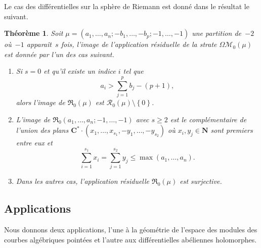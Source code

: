 \documentclass[JEP,XML,SOM,Unicode,francais,NoFloatCountersInSection,published]{cedram}
\let\mathcal\mathscr
\newenvironment{enumeratei}
{\bgroup\def\theenumi{\roman{enumi}}\def\theenumii{\arabic{enumii}}\begin{enumerate}}
{\end{enumerate}\egroup}
\newcommand{\CC}{\mathbf{C}}
\newcommand{\NN}{\mathbf{N}}
\newcommand{\appres}[1][g]{\mathfrak{R}_{#1}}
\newcommand{\espres}[1][g]{\mathcal{R}_{#1}}
\newcommand{\omoduli}[1][g]{{\Omega\mathcal M}_{\!#1}}
\newtheorem{thm}{Théorème}[section]
\theoremstyle{definition}
\begin{document}
Le cas des différentielles sur la sphère de Riemann est donné dans le résultat le suivant.
\begin{thm}\label{thm:geq0keq1}
Soit $\mu=(a_{1},\dots,a_{n};-b_{1},\dots,-b_{p};-1,\dots,-1)$ une partition de~$-2$ où~$-1$ apparaît~$s$ fois, l'image de l'application résiduelle de la strate $\omoduli[0](\mu)$ est donnée par l'un des cas suivant.
\begin{enumeratei}
\item\label{thm:geq0keq1i} Si $s=0$ et qu'il existe un indice $i$ tel que
\begin{equation}\label{eq:genrezeroresiduzerofr}
a_{i}>\sum_{j=1}^{p}b_{j}-(p+1),
\end{equation}
alors l'image de $\appres[0](\mu)$ est $\espres[0](\mu)\setminus\left\{0\right\}$.
\item\label{thm:geq0keq1ii} L'image de $\appres[0](a_{1},\dots,a_{n};-1,\dots,-1)$ avec $s\geq2$ est le complémentaire de l'union des plans $\CC^{\ast} \cdot (x_{1},\dots,x_{s_{1}},-y_{1},\dots,-y_{s_{2}})$ où $x_{i},y_{j} \in \NN$ sont premiers entre eux et
\begin{equation}\label{eq:polessimples}
\sum_{i=1}^{s_{1}} x_{i} = \sum_{j=1}^{s_{2}} y_{j} \leq \max(a_{1},\dots,a_{n}).
\end{equation}
\item\label{thm:geq0keq1iii} Dans les autres cas, l'application résiduelle $\appres[0](\mu)$ est surjective.
\end{enumeratei}
\end{thm}

\subsection{Applications}
\label{sec:apliintro}

Nous donnons deux applications, l'une à la géométrie de l'espace des modules des courbes algébriques pointées et l'autre aux différentielles abéliennes holomorphes.
\end{document}
